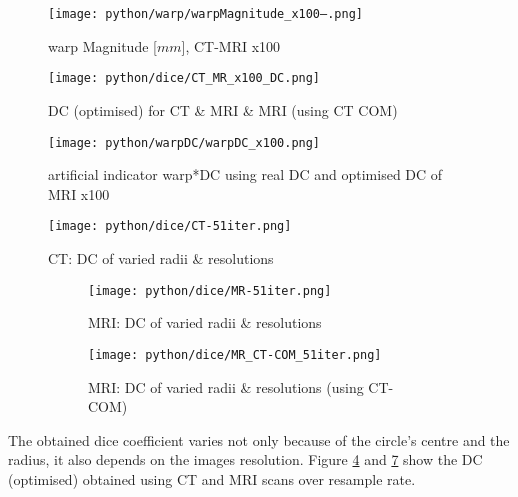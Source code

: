 \begin{figure}[!tp]
    \centering
    \texttt{[image: python/warp/warpMagnitude\_x100--.png]}
    \caption{warp Magnitude [$mm$], CT-MRI x100}
    \label{fig:warpMagnitude_x100}
\end{figure}
\begin{figure}[!bp]
    \centering
    \texttt{[image: python/dice/CT\_MR\_x100\_DC.png]}
    \caption{DC (optimised) for CT \& MRI \& MRI (using CT COM)}
    \label{fig:CT_MR_x100_DC}
\end{figure}

\begin{figure}[!tp]
    \centering
    \texttt{[image: python/warpDC/warpDC\_x100.png]}
    \caption{artificial indicator warp*DC using real DC and optimised DC of MRI x100}
    \label{fig:warpDC_x100}
\end{figure}
\begin{figure}[!bp]
  \centering
  \texttt{[image: python/dice/CT-51iter.png]}
  \caption{CT: DC of varied radii \& resolutions}
  \label{fig:CT_dc}
\end{figure}

\begin{figure}[!tbp]
  \begin{subfigure}[b]{\textwidth}
    \centering
    \texttt{[image: python/dice/MR-51iter.png]}
    \caption{MRI: DC of varied radii \& resolutions}
    \label{fig:MR_dc-opti}
  \end{subfigure}
  \begin{subfigure}[!b]{\textwidth}
    \centering
    \texttt{[image: python/dice/MR\_CT-COM\_51iter.png]}
    \caption{MRI: DC of varied radii \& resolutions (using CT-COM)}
    \label{fig:MR_CT-COM_dc-opti}
  \end{subfigure}
  \caption{}
  \label{fig:MR_dc}
\end{figure}


The obtained dice coefficient varies not only because of the circle's centre and the radius, it also depends on the images resolution.
Figure \ref{fig:CT_dc} and \ref{fig:MR_dc} show the DC (optimised) obtained using CT and MRI scans over resample rate.



